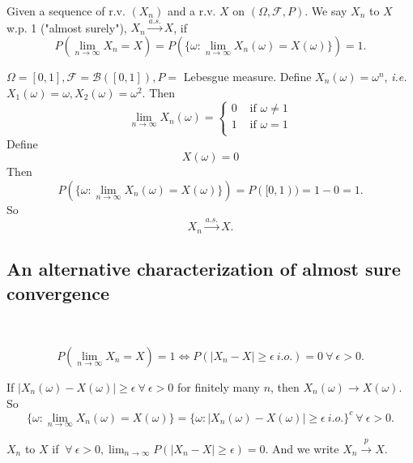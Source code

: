 \documentclass[class=article,crop=false]{standalone}
\begin{document}
\begin{defn}[]
	Given a sequence of r.v. $ (X_n)$ and a r.v. $ X$ on  $ (\Omega,\mathcal{F},P)$. We say $ X_n$  to $ X$ w.p. 1 ("almost surely"), $ X_n \xrightarrow{ a.s.} X $, if  \[ P\left( \lim_{ n \to \infty} X_n=X \right) = P(\{\omega: \lim_{ n \to \infty} X_n(\omega) = X(\omega)\} ) =1.\]
\end{defn}

\begin{eg}[]
	$ \Omega = [0,1],\mathcal{F}=\mathcal{B}([0,1]), P=$ Lebesgue measure. Define $ X_n(\omega) = \omega^{n}$, \emph{i.e.} $ X_1(\omega)=\omega, X_2(\omega)=\omega^2$. Then
	\begin{equation*}
		\lim_{ n \to \infty} X_n(\omega) =
	\begin{cases}
		0 & \text{ if } \omega\neq 1\\
		1 & \text{ if } \omega=1 \\
	\end{cases}
	\end{equation*}
	Define
	\begin{equation*}
		X(\omega)=0
	\end{equation*}
	Then
	\[
		P(\{\omega:\lim_{ n \to \infty} X_n(\omega)=X(\omega)\} )=P([0,1))=1-0=1
	.\] 
	So
	\[
	X_n \xrightarrow{ a.s.} X 
	.\] 
\end{eg}

\subsection*{An alternative characterization of almost sure convergence}
~\begin{thm}
\[
	P\left( \lim_{ n \to \infty} X_n =X \right) =1 \iff P(|X_n - X| \geq \epsilon\ i.o.) =0 \ \forall \ \epsilon>0
.\]
\end{thm}
\begin{prf}

	If  $ |X_n(\omega)-X(\omega)| \geq \epsilon \ \forall \ \epsilon>0$ for finitely many $ n$, then  $ X_n(\omega) \to X(\omega)$. So
	\[
		\{\omega:\lim_{ n \to \infty} X_n(\omega)=X(\omega)\} = \{\omega: |X_n(\omega)-X(\omega)|\geq \epsilon \ i.o.\}^{c} \ \forall \ \epsilon>0  
	.\] 

\end{prf}

\begin{defn}
	$ X_n$  to $ X$ if  $ \ \forall \ \epsilon>0, \lim_{ n \to \infty} P(|X_n -X|\geq \epsilon) =0$. And we write $ X_n \xrightarrow{ p}  X$. 
\end{defn}
\end{document}
